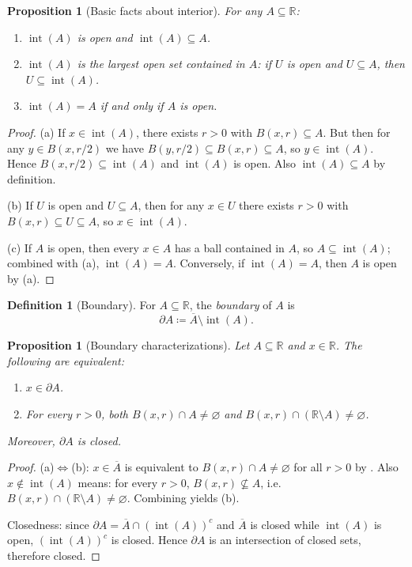 \documentclass[12pt]{article}
\numberwithin{equation}{section}
\newcommand{\RR}{\mathbb{R}}
\let\emptyset\varnothing
\DeclareMathOperator{\Int}{int}
\theoremstyle{plain}
\newtheorem{proposition}[theorem]{Proposition}
\theoremstyle{definition}
\newtheorem{definition}[theorem]{Definition}
\theoremstyle{remark}
\begin{document}
\begin{proposition}[Basic facts about interior]\label{prop:interior-basic}
For any $A\subseteq\RR$:
\begin{enumerate}[label=(\alph*)]
\item $\Int(A)$ is open and $\Int(A)\subseteq A$.
\item $\Int(A)$ is the \emph{largest} open set contained in $A$: if $U$ is open and $U\subseteq A$, then $U\subseteq \Int(A)$.
\item $\Int(A)=A$ if and only if $A$ is open.
\end{enumerate}
\end{proposition}

\begin{proof}
(a) If $x\in\Int(A)$, there exists $r>0$ with $B(x,r)\subseteq A$.
But then for any $y\in B(x,r/2)$ we have $B(y,r/2)\subseteq B(x,r)\subseteq A$, so $y\in\Int(A)$.
Hence $B(x,r/2)\subseteq \Int(A)$ and $\Int(A)$ is open. Also $\Int(A)\subseteq A$ by definition.

(b) If $U$ is open and $U\subseteq A$, then for any $x\in U$ there exists $r>0$ with $B(x,r)\subseteq U\subseteq A$, so $x\in\Int(A)$.

(c) If $A$ is open, then every $x\in A$ has a ball contained in $A$, so $A\subseteq \Int(A)$; combined with (a), $\Int(A)=A$.
Conversely, if $\Int(A)=A$, then $A$ is open by (a).
\end{proof}

\begin{definition}[Boundary]\label{def:boundary}
For $A\subseteq\RR$, the \emph{boundary} of $A$ is
\[
\partial A \coloneqq \overline{A}\setminus \Int(A).
\]
\end{definition}

\begin{proposition}[Boundary characterizations]\label{prop:boundary-char}
Let $A\subseteq\RR$ and $x\in\RR$. The following are equivalent:
\begin{enumerate}[label=(\alph*)]
\item $x\in \partial A$.
\item For every $r>0$, both $B(x,r)\cap A\neq\emptyset$ and $B(x,r)\cap (\RR\setminus A)\neq\emptyset$.
\end{enumerate}
Moreover, $\partial A$ is closed.
\end{proposition}

\begin{proof}
(a)$\Leftrightarrow$(b):
$x\in\overline{A}$ is equivalent to $B(x,r)\cap A\neq\emptyset$ for all $r>0$ by .
Also $x\notin \Int(A)$ means: for every $r>0$, $B(x,r)\nsubseteq A$, i.e.\ $B(x,r)\cap(\RR\setminus A)\neq\emptyset$.
Combining yields (b).

Closedness: since $\partial A=\overline{A}\cap (\Int(A))^c$ and $\overline{A}$ is closed while $\Int(A)$ is open, $(\Int(A))^c$ is closed.
Hence $\partial A$ is an intersection of closed sets, therefore closed.
\end{proof}
\end{document}
